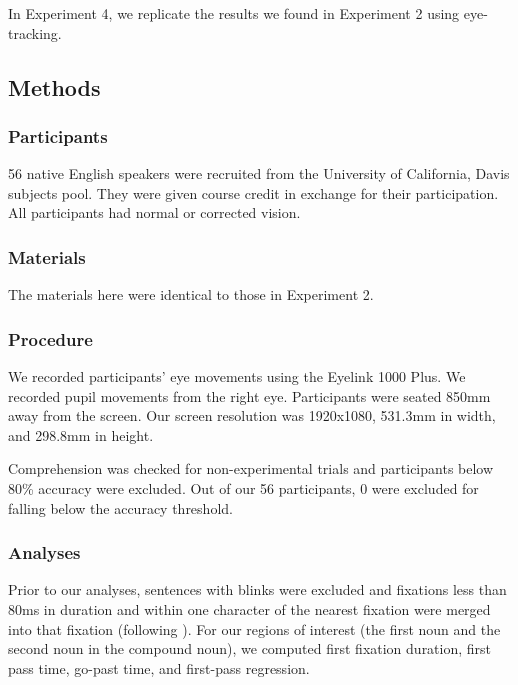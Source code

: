 \documentclass[
  12pt,
  letterpaper,
]{scrreprt}
\begin{document}
In Experiment 4, we replicate the results we found in Experiment 2 using
eye-tracking.

\subsection{Methods}\label{methods-3}

\subsubsection{Participants}\label{participants-3}

56 native English speakers were recruited from the University of
California, Davis subjects pool. They were given course credit in
exchange for their participation. All participants had normal or
corrected vision.

\subsubsection{Materials}\label{materials-1}

The materials here were identical to those in Experiment 2.

\subsubsection{Procedure}\label{procedure-2}

We recorded participants' eye movements using the Eyelink 1000 Plus. We
recorded pupil movements from the right eye. Participants were seated
850mm away from the screen. Our screen resolution was 1920x1080, 531.3mm
in width, and 298.8mm in height.

Comprehension was checked for non-experimental trials and participants
below 80\% accuracy were excluded. Out of our 56 participants, 0 were
excluded for falling below the accuracy threshold.

\subsubsection{Analyses}\label{analyses-1}

Prior to our analyses, sentences with blinks were excluded and fixations
less than 80ms in duration and within one character of the nearest
fixation were merged into that fixation (following
). For
our regions of interest (the first noun and the second noun in the
compound noun), we computed first fixation duration, first pass time,
go-past time, and first-pass regression.
\end{document}
